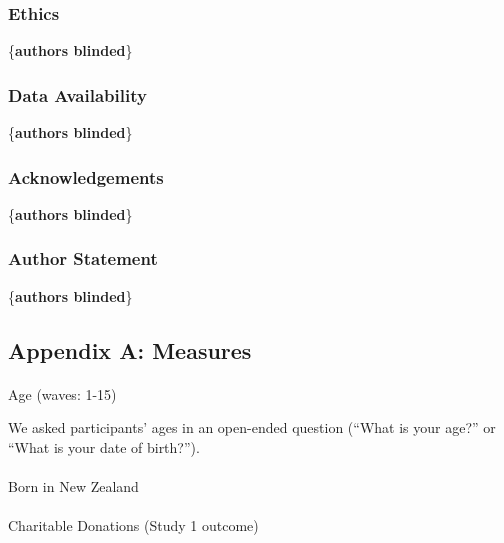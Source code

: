 \documentclass[
  single column]{article}
\makeatletter
\let\oldparagraph\paragraph
\renewcommand{\paragraph}{
    \@ifstar
      \xxxParagraphStar
      \xxxParagraphNoStar
  }
\newcommand{\xxxParagraphStar}[1]{\oldparagraph*{#1}\mbox{}}
\newcommand{\xxxParagraphNoStar}[1]{\oldparagraph{#1}\mbox{}}
\makeatother
\begin{document}
\newpage{}

\subsubsection{Ethics}\label{ethics}

\{\textbf{authors blinded}\}

\subsubsection{Data Availability}\label{data-availability}

\{\textbf{authors blinded}\}

\subsubsection{Acknowledgements}\label{acknowledgements}

\{\textbf{authors blinded}\}

\subsubsection{Author Statement}\label{author-statement}

\{\textbf{authors blinded}\}

\newpage{}

\subsection{Appendix A: Measures}\label{appendix-measures}

\paragraph{Age (waves: 1-15)}\label{age-waves-1-15}

We asked participants' ages in an open-ended question (``What is your
age?'' or ``What is your date of birth?'').

\paragraph{Born in New Zealand}\label{born-in-new-zealand}

\paragraph{Charitable Donations (Study 1
outcome)}\label{charitable-donations-study-1-outcome}
\end{document}
